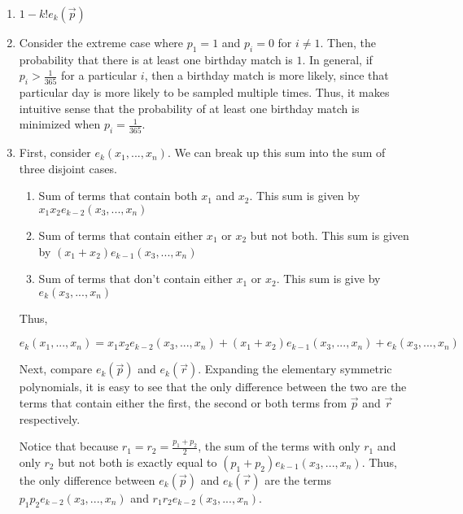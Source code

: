 \begin{enumerate}[label=(\alph*)]
\item $1 - k!e_{k}\left(\overrightarrow{p}\right)$

\item Consider the extreme case where $p_{1} = 1$ and $p_{i} = 0$ for $i \neq 1$. 
Then, the probability that there is at least one birthday match is $1$. 
In general, if $p_{i} > \frac{1}{365}$ for a particular $i$, then a 
birthday match is more likely, since that particular day is more likely to be 
sampled multiple times. Thus, it makes intuitive sense that the probability of 
at least one birthday match is minimized when $p_{i} = \frac{1}{365}$.

\item First, consider $e_{k}\left(x_{1},...,x_{n}\right)$. We can break up this 
sum into the sum of three disjoint cases.
  \begin{enumerate}
    \item Sum of terms that contain both $x_{1}$ and $x_{2}$. This sum is given 
    by $x_{1}x_{2}e_{k-2}\left(x_{3},...,x_{n}\right)$

    \item Sum of terms that contain either $x_{1}$ or $x_{2}$ but not both. 
    This sum is given by $\left(x_{1} + x_{2}\right)e_{k-1}\left(x_{3},...,x_{n}\right)$

    \item Sum of terms that don't contain either $x_{1}$ or $x_{2}$. This sum 
    is give by $e_{k}\left(x_{3},...,x_{n}\right)$
  \end{enumerate}

  Thus, 

  $$e_{k}(x_{1},...,x_{n}) = x_{1}x_{2}e_{k-2}(x_{3},...,x_{n}) + (x_{1} + 
  x_{2})e_{k-1}(x_{3},...,x_{n}) + e_{k}(x_{3},...,x_{n})$$

  Next, compare $e_{k}\left(\overrightarrow{p}\right)$ and 
  $e_{k}\left(\overrightarrow{r}\right)$. Expanding the elementary symmetric 
  polynomials, it is easy to see that the only difference between the two are 
  the terms that contain either the first, the second or both terms from 
  $\overrightarrow{p}$ and $\overrightarrow{r}$ respectively. 

  Notice that because $r_{1} = r_{2} = \frac{p_{1} + p_{2}}{2}$, the sum of the 
  terms with only $r_{1}$ and only $r_{2}$ but not both is exactly equal to 
  $(p_{1} + p_{2})e_{k-1}(x_{3},...,x_{n})$. Thus, the only difference between 
  $e_{k}\left(\overrightarrow{p}\right)$ and $e_{k}\left(\overrightarrow{r}\right)$ 
  are the terms $p_{1}p_{2}e_{k-2}(x_{3},...,x_{n})$ and 
  $r_{1}r_{2}e_{k-2}(x_{3},...,x_{n})$.


\end{enumerate}
